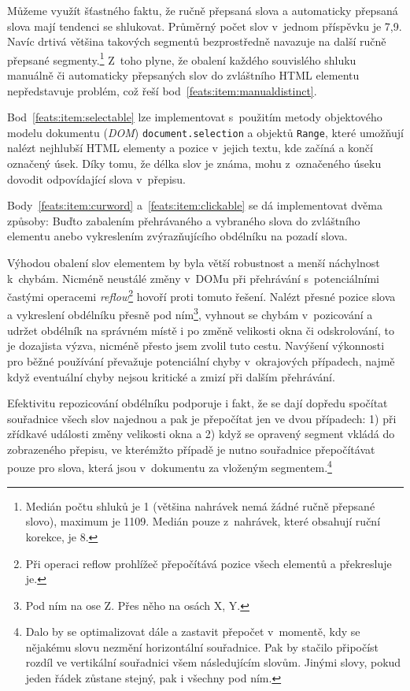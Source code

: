 Můžeme využít šťastného faktu, že ručně přepsaná slova a automaticky přepsaná
slova mají tendenci se shlukovat. Průměrný počet slov v~jednom příspěvku je 7,9.
Navíc drtivá většina takových segmentů bezprostředně navazuje na další ručně
přepsané segmenty.\footnote{Medián počtu shluků je 1 (většina nahrávek nemá
žádné ručně přepsané slovo), maximum je 1109. Medián pouze z~nahrávek, které
obsahují ruční korekce, je 8.}
Z~toho plyne, že obalení každého souvislého shluku manuálně či automaticky
přepsaných slov do zvláštního HTML elementu nepředstavuje problém, což řeší
bod~\ref{feats:item:manualdistinct}.

Bod~\ref{feats:item:selectable} lze implementovat s~použitím metody objektového
modelu dokumentu ({\em DOM}) \texttt{document.selection} a objektů
\texttt{Range}, které umožňují nalézt nejhlubší HTML elementy a pozice v~jejich
textu, kde začíná a končí označený úsek. Díky tomu, že délka slov je známa, mohu
z~označeného úseku dovodit odpovídající slova v~přepisu.

Body~\ref{feats:item:curword} a~\ref{feats:item:clickable} se dá implementovat
dvěma způsoby: Buďto zabalením přehrávaného a vybraného slova do zvláštního
elementu anebo vykreslením zvýrazňujícího obdélníku na pozadí slova.

Výhodou obalení slov elementem by byla větší robustnost a menší náchylnost
k~chybám. Nicméně neustálé změny v~DOMu při přehrávání s~potenciálními častými
operacemi {\em reflow}\footnote{Při operaci reflow prohlížeč přepočítává pozice
všech elementů a překresluje je.} hovoří proti tomuto řešení. Nalézt přesné
pozice slova a vykreslení obdélníku přesně pod ním\footnote{Pod ním na ose Z.
Přes něho na osách X, Y.}, vyhnout se chybám v~pozicování a udržet
obdélník na správném místě i po změně velikosti okna či odskrolování, to je
dozajista výzva, nicméně přesto jsem zvolil tuto cestu. Navýšení výkonnosti pro
běžné používání převažuje potenciální chyby v~okrajových případech, najmě když
eventuální chyby nejsou kritické a zmizí při dalším přehrávání.

Efektivitu repozicování obdélníku podporuje i fakt, že se dají dopředu spočítat
souřadnice všech slov najednou a pak je přepočítat jen ve dvou případech:
1) při zřídkavé události změny velikosti okna a
2) když se opravený segment vkládá do zobrazeného přepisu, ve kterémžto případě
je nutno souřadnice přepočítávat pouze pro slova, která jsou v~dokumentu za
vloženým segmentem.\footnote{Dalo by se optimalizovat dále a zastavit přepočet
v~momentě, kdy se nějakému slovu nezmění horizontální souřadnice. Pak by stačilo
připočíst rozdíl ve vertikální souřadnici všem následujícím slovům. Jinými
slovy, pokud jeden řádek zůstane stejný, pak i všechny pod ním.}

